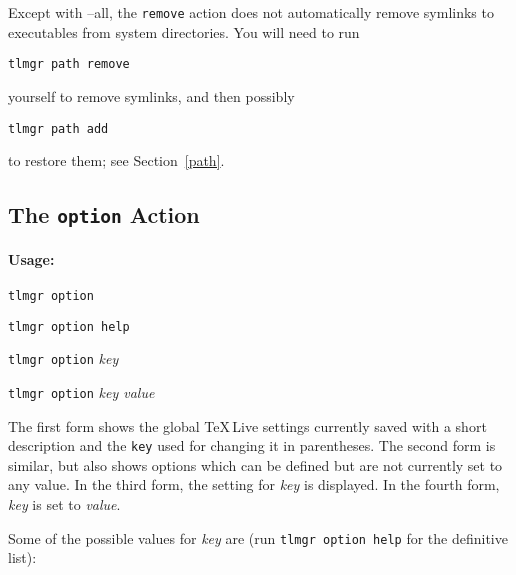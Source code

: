 \documentclass[11pt]{article}
\begin{document}
\begin{sloppypar}
\par\noindent
Except with --all, the \texttt{remove} action does not automatically remove symlinks to executables
from system directories. You will need to run 
\end{sloppypar}
\begin{list}{}{}
\item \texttt{tlmgr path remove} 
\end{list}
yourself to remove symlinks,
and then possibly
\begin{list}{}{}
\item \texttt{tlmgr path add} 
\end{list}
to restore them;
see Section~\ref{path}.

\clearpage

\subsection{The {\tt option} Action}
\label{option}

\paragraph{Usage:}

\begin{list}{}{}
\item \texttt{tlmgr option} 
\item \texttt{tlmgr option help} 
\item \texttt{tlmgr option} \textsl{key}
\item \texttt{tlmgr option} \textsl{key value}
\end{list}

The first form shows the global \TeX\,Live settings currently
saved with a short description and the \texttt{key}
used for changing it in parentheses. The second form is
similar, but also shows options which can be defined but
are not currently set to any value. In the third form, the
setting for \textsl{key} is displayed. In the fourth form,
\textsl{key} is set to \textsl{value}.

Some of the possible values for \textsl{key} are (run \texttt{tlmgr
option help} for the definitive list):
\end{document}
